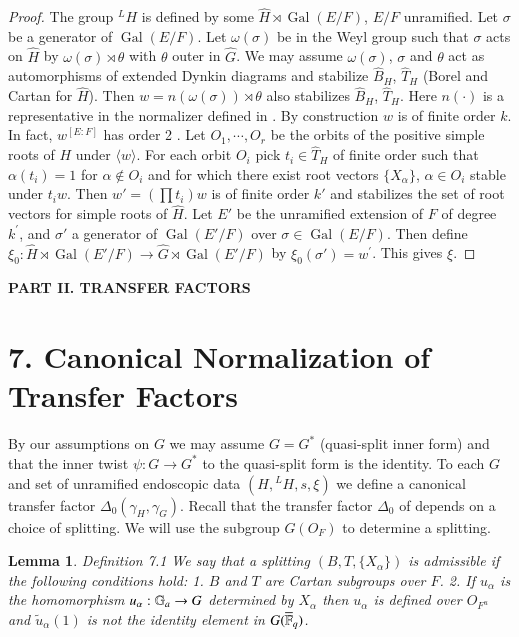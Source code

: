\documentclass[11pt]{amsart}
\theoremstyle{plain}
\newtheorem{lemma}[theorem]{Lemma}
\theoremstyle{definition}
\def\Gal{\operatorname{\text{Gal}}}          %
\def\LANGLANDSO{21}
\begin{document}
\begin{proof}  The group ${}^LH$ is
defined by some $\widehat H\rtimes\Gal(E/F)$,
$E/F$ unramified.  Let $\sigma$ be a generator of 
$\Gal(E/F)$.  Let $\omega(\sigma)$ be in the Weyl group such that
$\sigma$ acts on $\widehat H$ by $\omega(\sigma)\rtimes\theta$
with $\theta$ outer in $\widehat G$. We may assume
$\omega(\sigma)$, $\sigma$ and $\theta$ act as 
automorphisms of extended Dynkin diagrams and stabilize $\widehat B_H$,
$\widehat T_H$ (Borel and Cartan for $\widehat H$).  Then
$w=n(\omega(\sigma))\rtimes\theta$ also stabilizes $\widehat B_H$,
$\widehat T_H$.  Here $n(\cdot)$ is a representative in the normalizer
defined in \cite{\LANGLANDSO}.  By construction $w$
is of finite order $k$.  In fact, 
$w^{[E:F]}$ has order 2 \cite{\LANGLANDSO}.
Let $O_1,\cdots,O_r$ be the orbits
of the positive simple roots of $H$ under $\langle w\rangle$.
For each orbit $O_i$ pick $t_i\in \widehat T_H$ of finite order such that
$\alpha(t_i)=1$ for $\alpha\not\in O_i$ and for which there exist root
vectors $\{X_\alpha\}$, $\alpha\in O_i$ stable under $t_iw$.  Then
$w' = (\prod t_i)w$ is of finite order $k'$ and stabilizes the set of root vectors
for simple roots of $\widehat H$.  Let $E'$ be the unramified extension of $F$
of degree $k^\prime$, and $\sigma'$ a generator of $\Gal(E'/F)$ over $\sigma\in\Gal(E/F)$. 
Then define
$
\xi_0:\widehat H\rtimes\Gal(E'/F)
\to \widehat G\rtimes\Gal(E'/F)
$
by $\xi_0(\sigma') =w^\prime$.  This gives $\xi$.
\end{proof}
\vfil\eject 

\centerline{\bf PART II.  TRANSFER FACTORS}\bigskip

\section{7.  Canonical Normalization of Transfer Factors}

By our assumptions on $G$ we may assume $G=G^*$ (quasi-split
inner form) and that the inner twist $\psi:G\to G^*$ to the
quasi-split form is the identity.  To each $G$ and set
of unramified endoscopic data $(H,{}^LH,s,\xi)$ we define
a canonical transfer factor $\Delta_0(\gamma_H,\gamma_G)$.
Recall that the transfer factor $\Delta_0$ of \cite{\LANGLANDSO}
depends on a choice of splitting.  We will use the
subgroup $G(O_F)$ to determine a splitting.

\begin{lemma}{Definition 7.1}  We say that a splitting 
$(B,T,\{X_\alpha\})$ is admissible if the following conditions hold:
{1.}  $B$ and $T$ are Cartan subgroups over $F$.
{2.}  If $u_\alpha$ is the homomorphism
$u_\alpha:\Bbb G_a\to G$ determined by $X_\alpha$ then
$u_\alpha$ is defined over $O_{F^u}$ and $\tilde u_\alpha(1)$
is not the identity element in $G(\overline{\Bbb F}_q)$.
\end{lemma}
\end{document}
